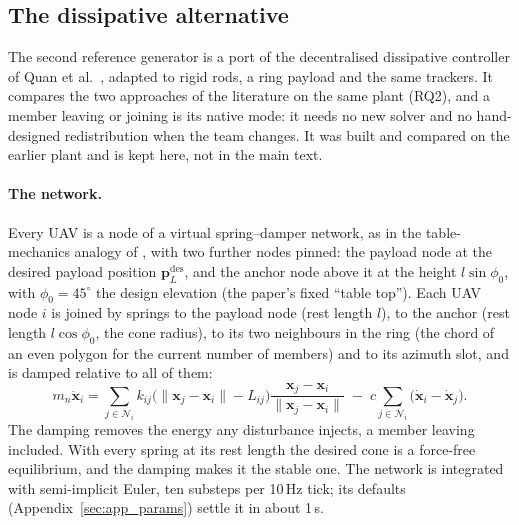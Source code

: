 
\subsection{The dissipative alternative}
\label{sec:dissipative}

The second reference generator is a port of the decentralised dissipative controller of Quan et
al.\ \cite{quan2025swarm}, adapted to rigid rods, a ring payload and the same trackers. It compares the
two approaches of the literature on the same plant (RQ2), and a member leaving or joining is its native
mode: it needs no new solver and no hand-designed redistribution when the team changes. It was built and
compared on the earlier plant and is kept here, not in the main text.

\paragraph{The network.} Every UAV is a node of a virtual spring--damper network, as in the
table-mechanics analogy of \cite{quan2025swarm}, with two further nodes pinned: the payload node at the
desired payload position $\mathbf{p}_L^{\mathrm{des}}$, and the anchor node above it at the height
$l \sin\phi_0$, with $\phi_0 = 45^\circ$ the design elevation (the paper's fixed ``table top''). Each UAV
node $i$ is joined by springs to the payload node (rest length $l$), to the anchor (rest length
$l\cos\phi_0$, the cone radius), to its two neighbours in the ring (the chord of an even polygon for the
current number of members) and to its azimuth slot, and is damped relative to all of them:
\begin{equation}
    m_n \ddot{\mathbf{x}}_i = \sum_{j \in \mathcal{N}_i} k_{ij}\big(\|\mathbf{x}_j - \mathbf{x}_i\| - L_{ij}\big)
    \frac{\mathbf{x}_j - \mathbf{x}_i}{\|\mathbf{x}_j - \mathbf{x}_i\|}
    \; - \; c \sum_{j \in \mathcal{N}_i} \big(\dot{\mathbf{x}}_i - \dot{\mathbf{x}}_j\big).
    \label{eq:network}
\end{equation}
The damping removes the energy any disturbance injects, a member leaving included. With every spring
at its rest length the desired cone is a force-free equilibrium, and the damping makes it the stable
one. The network is integrated with semi-implicit Euler, ten substeps per 10\,Hz tick; its defaults
(Appendix~\ref{sec:app_params}) settle it in about 1\,s.

